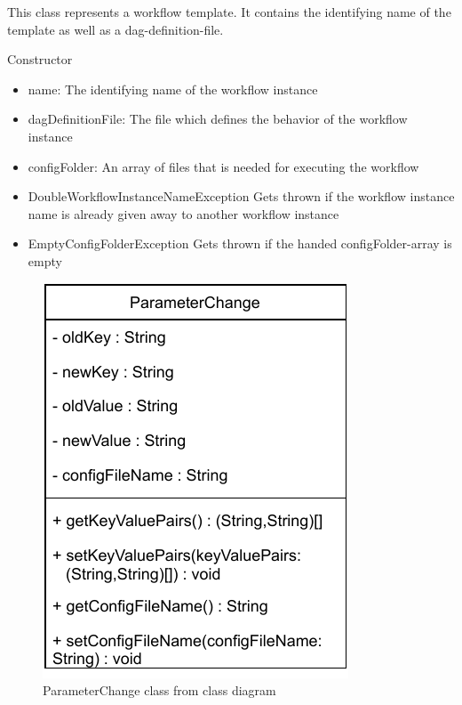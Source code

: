 This class represents a workflow template. It contains the identifying name of the template as well as a dag-definition-file.

\begin{methodenv}{Constructor}


\begin{itemize}
	\item{name:}
	The identifying name of the workflow instance
	\item{dagDefinitionFile:}
	The file which defines the behavior of the workflow instance
	\item{configFolder:}
	An array of files that is needed for executing the workflow
\end{itemize}

\begin{itemize}
	\item{DoubleWorkflowInstanceNameException}
	Gets thrown if the workflow instance name is already given away to another workflow instance
	\item{EmptyConfigFolderException}
	Gets thrown if the handed configFolder-array is empty
\end{itemize}

\end{methodenv}



\begin{figure}[h]
\centerline{\includegraphics[scale=1]{res/Klassen/ParameterChange.pdf}}
\caption{ParameterChange class from class diagram}
\end{figure}

